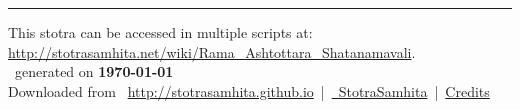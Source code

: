 \documentclass[a5paper,twoside,12pt]{book}
\begin{document}
\setmainfont[Script=Devanagari,Mapping=tex-text]{Sanskrit 2003}
\fontsize {16}{19.25}\selectfont
\let\head\chapt
\begin{center}

\end{center}
\vfill
\centering
\rule{0.8\textwidth}{0.6pt}

\footnotesize
{}\sffamily
This stotra can be accessed in multiple scripts at:\\
\url{http://stotrasamhita.net/wiki/Rama_Ashtottara_Shatanamavali}.\\[1ex]
\faFilePdfO~generated on \textbf{\today}\\[1ex]
Downloaded from \faGlobe{}~\url{http://stotrasamhita.github.io}~|~\href{https://github.com/StotraSamhita}{\faGithubSquare{}~StotraSamhita}~|~\href{https://stotrasamhita.github.io/about/}{Credits}
\end{document}
